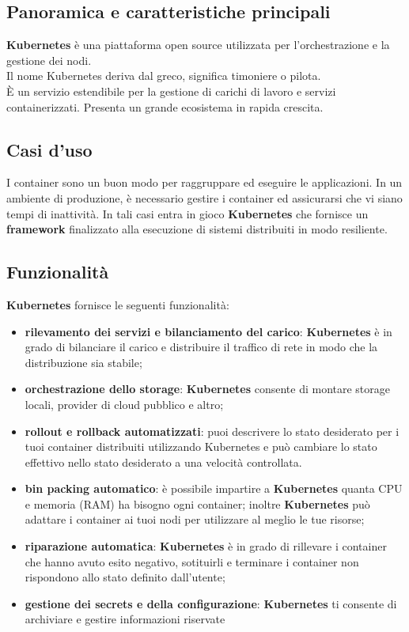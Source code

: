 \documentclass{article}
\begin{document}
\subsection{Panoramica e caratteristiche principali}
\textbf{Kubernetes} è una piattaforma open source utilizzata per l'orchestrazione e la gestione dei nodi.\\
Il nome Kubernetes deriva dal greco, significa timoniere o pilota. \\
È un servizio estendibile per la gestione di carichi di lavoro e servizi containerizzati. Presenta un grande ecosistema in rapida crescita. \\

\subsection{Casi d'uso}
I container sono un buon modo per raggruppare ed eseguire le applicazioni. In un ambiente di produzione, è necessario gestire i container ed assicurarsi che vi siano tempi di inattività. In tali casi entra in gioco \textbf{Kubernetes} che fornisce un \textbf{framework} finalizzato alla esecuzione di sistemi distribuiti in modo resiliente. \\
\subsection{Funzionalità}
\textbf{Kubernetes} fornisce le seguenti funzionalità:
\begin{itemize}
    \item \textbf{rilevamento dei servizi e bilanciamento del carico}: \textbf{Kubernetes} è in grado di bilanciare il carico e distribuire il traffico di rete in modo che la distribuzione sia stabile;
    \item \textbf{orchestrazione dello storage}: \textbf{Kubernetes} consente di montare storage locali, provider di cloud pubblico e altro;
    \item \textbf{rollout e rollback automatizzati}: puoi descrivere lo stato desiderato per i tuoi container distribuiti utilizzando Kubernetes e può cambiare lo stato effettivo nello stato desiderato a una velocità controllata.
    \item \textbf{bin packing automatico}: è possibile impartire a \textbf{Kubernetes} quanta CPU e memoria (RAM) ha bisogno ogni container; inoltre \textbf{Kubernetes} può adattare i container ai tuoi nodi per utilizzare al meglio le tue risorse;
    \item \textbf{riparazione automatica}: \textbf{Kubernetes} è in grado di rillevare i container che hanno avuto esito negativo, sotituirli e terminare i container non rispondono allo stato definito dall'utente;
    \item \textbf{gestione dei secrets e della configurazione}: \textbf{Kubernetes} ti consente di archiviare e gestire informazioni riservate 
\end{itemize}
\end{document}
